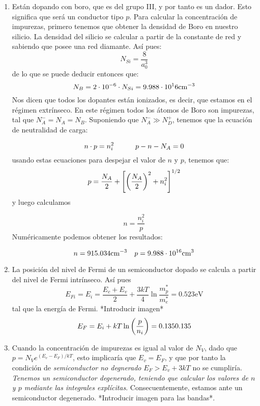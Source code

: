 \begin{texercise}
\begin{enumerate}[label=\alph*)]
		\item Están dopando con boro, que es del grupo III, y por tanto es un dador. Esto significa que será un conductor tipo $p$. Para calcular la concentración de impurezas, primero tenemos que obtener la densidad de Boro en nuestro silicio. La densidad del silicio se calcular a partir de la constante de red y sabiendo que posee una red diamante. Así pues:
		\begin{equation}
			N_{Si} = \frac{8}{a_0^3} 
		\end{equation}
		de lo que se puede deducir entonces que:
		\begin{equation}
			N_B = 2\cdot 10^{-6} \cdot N_{Si} = 9.988 \cdot 10^16 \text{cm}^{-3}
		\end{equation}
		Nos dicen que todos los dopantes están ionizados, es decir, que estamos en el régimen extrínseco. En este régimen todos los átomos de Boro son impurezas, tal que $N_A^-=N_A=N_B$. Suponiendo que $N_A^- \gg N_D^+$, tenemos que la ecuación de neutralidad de carga:

		\begin{equation}
			n\cdot p = n_i^2 \quad \quad \quad p-n-N_A = 0 
		\end{equation}
		usando estas ecuaciones para despejar el valor de $n$ y $p$, tenemos que:	
		\begin{equation}
			p = \frac{N_A}{2} + \left[ \left( \frac{N_A}{2} \right)^2 + n_i^2 \right]^{1/2} 
		\end{equation}
		y luego calculamos 

		\begin{equation}
			n = \frac{n_i^2}{p}
		\end{equation}
		Numéricamente podemos obtener los resultados:

		\begin{equation}
			n=915.034 \text{cm}^{-3} \quad p = 9.988 \cdot 10^{16} \text{cm}^3
		\end{equation}


		\item La posición del nivel de Fermi de un semiconductor dopado se calcula a partir del nivel de Fermi intrínseco. Así pues
		\begin{equation}
			E_{Fi} = E_i = \frac{E_c+E_v}{2} + \frac{3 kT}{4} \ln \frac{m_p^*}{m_e^*} = 0.523 \text{eV} 
		\end{equation}
		tal que la energía de Fermi. *Introducir imagen*
		\begin{equation}
			E_F = E_i + kT \ln \left( \frac{p}{n_i} \right) = 0.135 \text{0.135}
		\end{equation}
		\item Cuando la concentración de impurezas es igual al valor de $N_V$, dado que $p=N_V e^{(E_v-E_F)/kT}$, esto implicaría que $E_v = E_F$, y que por tanto la condición de \textit{semiconductor no degnerado} $E_F>E_v + 3kT$ no se cumpliría. \textit{Tenemos un semiconductor degenerado, teniendo que calcular los valores de $n$ y $p$ mediante las integrales explícitas}. Consecuentemente, estamos ante un semiconductor degenerado. *Introducir imagen para las bandas*.
	\end{enumerate}
\end{texercise}



